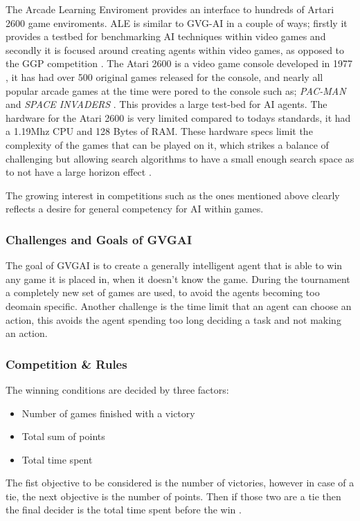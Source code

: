 \documentclass[journal]{IEEEtran}
\begin{document}
		The Arcade Learning Enviroment \cite{bellemare2013arcade} provides an interface to hundreds of Artari 2600 game enviroments. ALE is similar to GVG-AI in a couple of ways; firstly it provides a testbed for benchmarking AI techniques within video games and secondly it is focused around creating agents within video games, as opposed to the GGP competition \cite{GGP2005general}.
		The Atari 2600 is a video game console developed in 1977 , it has had over 500 original games released for the console, and nearly all popular arcade games at the time were pored to the console such as; \textit{PAC-MAN} and \textit{SPACE INVADERS} \cite{bellemare2013arcade}. This provides a large test-bed for AI agents.
		The hardware for the Atari 2600 is very limited compared to todays standards, it had a 1.19Mhz CPU and 128 Bytes of RAM. These hardware specs limit the complexity of the games that can be played on it, which strikes a balance of challenging but allowing search algorithms to have a small enough search space as to not have a large horizon effect \cite{MCTS}.
		
		The growing interest in competitions such as the ones mentioned above clearly reflects a desire for general competency for AI within games.

	\subsubsection{Challenges and Goals of GVGAI}
		The goal of GVGAI is to create a generally intelligent agent that is able to win any game it is placed in, when it doesn't know the game.
		During the tournament a completely new set of games are used, to avoid the agents becoming too deomain specific.
		Another challenge is the time limit that an agent can choose an action, this avoids the agent spending too long deciding a task and not making an action. \cite{schuster2015mcts}
		
		
	\subsubsection{Competition \& Rules}
	
		The winning conditions are decided by three factors:
		\begin{itemize}
		    \item Number of games finished with a victory
		    \item Total sum of points
		    \item Total time spent
		\end{itemize}
		The fist objective to be considered is the number of victories, however in case of a tie, the next objective is the number of points. Then if those two are a tie then the final decider is the total time spent before the win \cite{perez20162014}.
		
\end{document}
